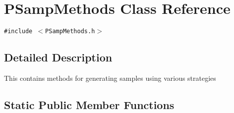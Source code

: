 \section{PSamp\-Methods Class Reference}
\label{classPSampMethods}
{\tt \#include $<$PSamp\-Methods.h$>$}



\subsection{Detailed Description}
This contains methods for generating samples using various strategies 

\subsection*{Static Public Member Functions}
